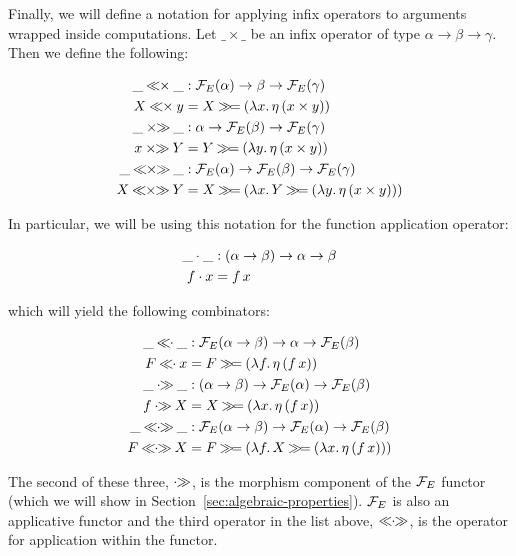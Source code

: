 Finally, we will define a notation for applying infix operators to
arguments wrapped inside computations. Let $\_ \times \_$ be an infix
operator of type $\alpha \to \beta \to \gamma$. Then we define the
following:

\begin{align*}
  \_ \opl{\times} \_ &: \FF_E(\alpha) \to \beta \to \FF_E(\gamma) \\
  X \opl{\times} y &= X \hsbind (\lam{x}{\ap{\eta}{(x \times y)}}) \\
  \_ \opr{\times} \_ &: \alpha \to \FF_E(\beta) \to \FF_E(\gamma) \\
  x \opr{\times} Y &= Y \hsbind (\lam{y}{\ap{\eta}{(x \times y)}}) \\
  \_ \oplr{\times} \_ &: \FF_E(\alpha) \to \FF_E(\beta) \to \FF_E(\gamma) \\
  X \oplr{\times} Y &= X \hsbind (\lam{x}{Y \hsbind (\lam{y}{\ap{\eta}{(x \times y)}})})
\end{align*}

In particular, we will be using this notation for the function application
operator:

\begin{align*}
  \_ \cdot \_ &: (\alpha \to \beta) \to \alpha \to \beta \\
  f \cdot x &= f\,x
\end{align*}

which will yield the following combinators:

\begin{align*}
  \_ \apl \_ &: \FF_E(\alpha \to \beta) \to \alpha \to \FF_E(\beta) \\
  F \apl x &= F \hsbind (\lam{f}{\ap{\eta}{(\ap{f}{x})}}) \\
  \_ \apr \_ &: (\alpha \to \beta) \to \FF_E(\alpha) \to \FF_E(\beta) \\
  f \apr X &= X \hsbind (\lam{x}{\ap{\eta}{(\ap{f}{x})}}) \\
  \_ \aplr \_ &: \FF_E(\alpha \to \beta) \to \FF_E(\alpha) \to \FF_E(\beta) \\
  F \aplr X &= F \hsbind (\lam{f}{X \hsbind (\lam{x}{\ap{\eta}{(\ap{f}{x})}})})
\end{align*}

The second of these three, $\mathbin{\cdot\!\!\gg}$, is the morphism component of the $\mathcal{F}_E$
functor (which we will show in
Section~\ref{sec:algebraic-properties}). $\mathcal{F}_E$ is also an applicative
functor and the third operator in the list above, $\mathbin{\ll\!\!\cdot\!\!\gg}$, is the operator
for application within the functor.


